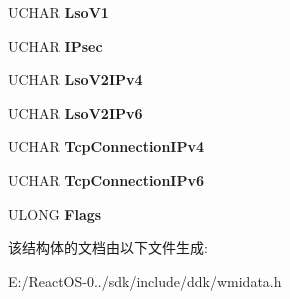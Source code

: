\begin{DoxyCompactItemize}
U\+C\+H\+AR {\bfseries Lso\+V1}
\item 
\mbox{\label{struct___m_s_ndis___tcp_offload_parameters_adc281df14814d00cd05a8b86a882c3e6}} 
U\+C\+H\+AR {\bfseries I\+Psec}
\item 
\mbox{\label{struct___m_s_ndis___tcp_offload_parameters_a402275e4fdfe486981fcdb2ef83107c6}} 
U\+C\+H\+AR {\bfseries Lso\+V2\+I\+Pv4}
\item 
\mbox{\label{struct___m_s_ndis___tcp_offload_parameters_a5d24bb9ca950e44ebd2ffd8452afb4a9}} 
U\+C\+H\+AR {\bfseries Lso\+V2\+I\+Pv6}
\item 
\mbox{\label{struct___m_s_ndis___tcp_offload_parameters_a1bbb876aa2f2adde83fd1e608898ad51}} 
U\+C\+H\+AR {\bfseries Tcp\+Connection\+I\+Pv4}
\item 
\mbox{\label{struct___m_s_ndis___tcp_offload_parameters_a635b9d71a45817aa7e681985c8bed535}} 
U\+C\+H\+AR {\bfseries Tcp\+Connection\+I\+Pv6}
\item 
\mbox{\label{struct___m_s_ndis___tcp_offload_parameters_ab8191a8490ed320447f0e5ee5c523b32}} 
U\+L\+O\+NG {\bfseries Flags}
\end{DoxyCompactItemize}


该结构体的文档由以下文件生成\+:\begin{DoxyCompactItemize}
\item 
E\+:/\+React\+O\+S-\/0../sdk/include/ddk/wmidata.\+h\end{DoxyCompactItemize}

